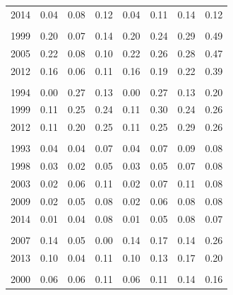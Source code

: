 \documentclass[
  11pt,
a4paper
]{article}
\begin{document}
\begin{longtable}[t]{rrrrrrrr}
\hspace{1em}2014 & 0.04 & 0.08 & 0.12 & 0.04 & 0.11 & 0.14 & 0.12\\
\addlinespace[0.3em]
\multicolumn{8}{l}{\textbf{Guinea}}\\
\hspace{1em}1999 & 0.20 & 0.07 & 0.14 & 0.20 & 0.24 & 0.29 & 0.49\\
\hspace{1em}2005 & 0.22 & 0.08 & 0.10 & 0.22 & 0.26 & 0.28 & 0.47\\
\hspace{1em}2012 & 0.16 & 0.06 & 0.11 & 0.16 & 0.19 & 0.22 & 0.39\\
\addlinespace[0.3em]
\multicolumn{8}{l}{\textbf{Ivory Coast}}\\
\hspace{1em}1994 & 0.00 & 0.27 & 0.13 & 0.00 & 0.27 & 0.13 & 0.20\\
\hspace{1em}1999 & 0.11 & 0.25 & 0.24 & 0.11 & 0.30 & 0.24 & 0.26\\
\hspace{1em}2012 & 0.11 & 0.20 & 0.25 & 0.11 & 0.25 & 0.29 & 0.26\\
\addlinespace[0.3em]
\multicolumn{8}{l}{\textbf{Kenya}}\\
\hspace{1em}1993 & 0.04 & 0.04 & 0.07 & 0.04 & 0.07 & 0.09 & 0.08\\
\hspace{1em}1998 & 0.03 & 0.02 & 0.05 & 0.03 & 0.05 & 0.07 & 0.08\\
\hspace{1em}2003 & 0.02 & 0.06 & 0.11 & 0.02 & 0.07 & 0.11 & 0.08\\
\hspace{1em}2009 & 0.02 & 0.05 & 0.08 & 0.02 & 0.06 & 0.08 & 0.08\\
\hspace{1em}2014 & 0.01 & 0.04 & 0.08 & 0.01 & 0.05 & 0.08 & 0.07\\
\addlinespace[0.3em]
\multicolumn{8}{l}{\textbf{Liberia}}\\
\hspace{1em}2007 & 0.14 & 0.05 & 0.00 & 0.14 & 0.17 & 0.14 & 0.26\\
\hspace{1em}2013 & 0.10 & 0.04 & 0.11 & 0.10 & 0.13 & 0.17 & 0.20\\
\addlinespace[0.3em]
\multicolumn{8}{l}{\textbf{Malawi}}\\
\hspace{1em}2000 & 0.06 & 0.06 & 0.11 & 0.06 & 0.11 & 0.14 & 0.16\\

\end{longtable}
\end{document}
